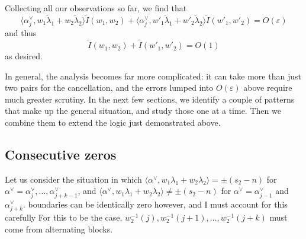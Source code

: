 \documentclass[11pt]{amsart}
\numberwithin{theorem}{section}
\numberwithin{equation}{section}
\theoremstyle{remark}
\theoremstyle{definition}
\begin{document}
{Collecting all our observations so far, we find that
\begin{equation*}
\langle \alpha^\vee_j,w_1\tilde\lambda_1+w_2\tilde\lambda_2\rangle\tilde I(w_1,w_2) + \langle\alpha^\vee_j,w'_1\tilde\lambda_1+w'_2\tilde\lambda_2\rangle\tilde I(w'_1,w'_2) = O(\varepsilon)
\end{equation*}
and thus
\begin{equation*}
\tilde I(w_1,w_2) + \tilde I(w'_1,w'_2) = O(1)
\end{equation*}
as desired.

In general, the analysis becomes far more complicated: it can take more than just two pairs for the cancellation, and the errors lumped into $O(\varepsilon)$ above require much greater scrutiny. In the next few sections, we identify a couple of patterns that make up the general situation, and study those one at a time. Then we combine them to extend the logic just demonstrated above.


\subsection{Consecutive zeros}

Let us consider the situation in which $\langle \alpha^\vee,w_1\lambda_1+ w_2\lambda_2\rangle = \pm(s_2-n)$ for $\alpha^\vee = \alpha^\vee_{j}, \ldots,\alpha^\vee_{j+k-1}$, and $\langle \alpha^\vee,w_1\lambda_1+ w_2\lambda_2\rangle \neq \pm(s_2-n)$ for $\alpha^\vee = \alpha^\vee_{j-1}$ and $\alpha^\vee_{j+k}$. {\color{red} boundaries can be identically zero however, and I must account for this carefully} For this to be the case, $w_2^{-1}(j), w_2^{-1}(j+1),\ldots,w_2^{-1}(j+k)$ must come from alternating blocks. 

}
\end{document}
